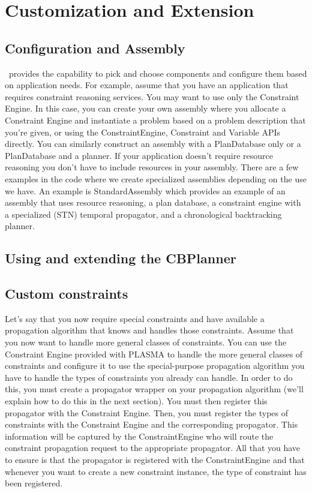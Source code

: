 \documentclass[10pt, letterpaper, twoside]{article}
\begin{document}
\section{Customization and Extension}
\subsection{Configuration and Assembly}
\label{assembly}

\ET\, provides the capability to pick and choose components and configure
them based on application needs.  For example, assume that you have an
application that requires constraint reasoning services.  You may want to
use only the Constraint Engine.  In this case, you can create your own
assembly where you allocate a Constraint Engine and instantiate a problem
based on a problem description that you're given, or using the
ConstraintEngine, Constraint and Variable APIs directly. You can similarly
construct an assembly with a PlanDatabase only or a PlanDatabase and a
planner. If your application doesn't require resource reasoning you don't
have to include resources in your assembly. There are a few examples in the
code where we create specialized assemblies depending on the use we have.
An example is StandardAssembly which provides an example of an assembly
that uses resource reasoning, a plan database, a constraint engine with a
specialized (STN) temporal propagator, and a chronological backtracking
planner.


\subsection{Using and extending the CBPlanner}

\subsection{Custom constraints}

Let's say that you now require special constraints and have available a
propagation algorithm that knows and handles those constraints.  Assume
that you now want to handle more general classes of constraints.  You can
use the Constraint Engine provided with PLASMA to handle the more general
classes of constraints and configure it to use the special-purpose
propagation algorithm you have to handle the types of constraints you
already can handle.  In order to do this, you must create a propagator
wrapper on your propagation algorithm (we'll explain how to do this in the
next section).  You must then register this propagator with the Constraint
Engine.  Then, you must register the types of constraints with the
Constraint Engine and the corresponding propagator.  This information will
be captured by the ConstraintEngine who will route the constraint
propagation request to the appropriate propagator.  All that you have to
ensure is that the propagator is registered with the ConstraintEngine and
that whenever you want to create a new constraint instance, the type of
constraint has been registered.
\end{document}
